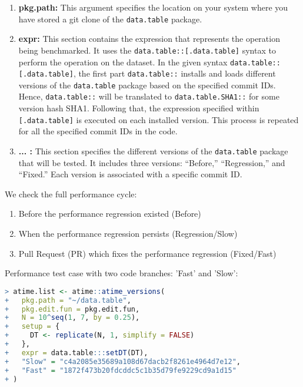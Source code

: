 \begin{enumerate}
    \item \textbf{pkg.path:} This argument specifies the location on your system where you have stored a git clone of the \texttt{data.table} package.
       
    \item \textbf{expr:} This section contains the expression that represents the operation being benchmarked. It uses the \texttt{data.table::[.data.table]} syntax to perform the operation on the dataset. In the given syntax \texttt{data.table::[.data.table]}, the first part \texttt{data.table::} installs and loads different versions of the \texttt{data.table} package based on the specified commit IDs. Hence, \texttt{data.table::} will be translated to \texttt{data.table.SHA1::} for some version hash SHA1. Following that, the expression specified within \texttt{[.data.table]} is executed on each installed version. This process is repeated for all the specified commit IDs in the code.
 
    \item \textbf{... :} This section specifies the different versions of the \texttt{data.table} package that will be tested. It includes three versions: ``Before,'' ``Regression,'' and ``Fixed.'' Each version is associated with a specific commit ID.
\end{enumerate}

We check the full performance cycle:

\begin{enumerate}
    \item Before the performance regression existed (Before)
    \item When the performance regression persists (Regression/Slow)
    \item Pull Request (PR) which fixes the performance regression (Fixed/Fast)
\end{enumerate}

\noindent Performance test case with two code branches: 'Fast' and 'Slow':\\

\begin{lstlisting}[language=R]
> atime.list <- atime::atime_versions(
+   pkg.path = "~/data.table",
+   pkg.edit.fun = pkg.edit.fun,
+   N = 10^seq(1, 7, by = 0.25),
+   setup = { 
+     DT <- replicate(N, 1, simplify = FALSE)
+   },
+   expr = data.table:::setDT(DT),
+   "Slow" = "c4a2085e35689a108d67dacb2f8261e4964d7e12",
+   "Fast" = "1872f473b20fdcddc5c1b35d79fe9229cd9a1d15"
+ )
\end{lstlisting}

